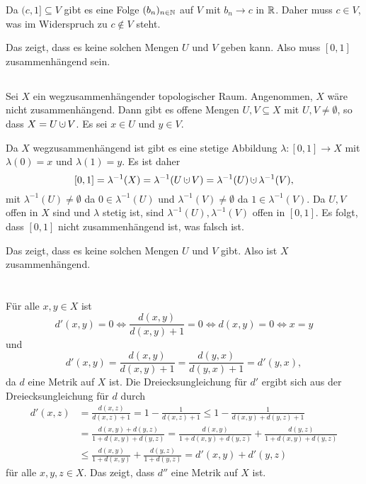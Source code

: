 \documentclass[a4paper,10pt]{article}
\begin{document}
Da $(c,1] \subseteq V$ gibt es eine Folge $(b_n)_{n \in \mathbb{N}}$ auf $V$ mit $b_n \to c$ in $\mathbb{R}$. Daher muss $c \in V$, was im Widerspruch zu $c \not\in V$ steht.

Das zeigt, dass es keine solchen Mengen $U$ und $V$ geben kann. Also muss $[0,1]$ zusammenhängend sein.


\subsection{}
Sei $X$ ein wegzusammenhängender topologischer Raum. Angenommen, $X$ wäre nicht zusammenhängend. Dann gibt es offene Mengen $U, V \subseteq X$ mit $U, V \neq \emptyset$, so dass $X = U \dotcup V$. Es sei $x \in U$ und $y \in V$.

Da $X$ wegzusammenhängend ist gibt es eine stetige Abbildung $\lambda : [0,1] \to X$ mit $\lambda(0) = x$ und $\lambda(1) = y$. Es ist daher
\[
 [0,1] = \lambda^{-1}(X) = \lambda^{-1}(U \dotcup V) = \lambda^{-1}(U) \dotcup \lambda^{-1}(V),
\]
mit $\lambda^{-1}(U) \neq \emptyset$ da $0 \in \lambda^{-1}(U)$ und $\lambda^{-1}(V) \neq \emptyset$ da $1 \in \lambda^{-1}(V)$. Da $U, V$ offen in $X$ sind und $\lambda$ stetig ist, sind $\lambda^{-1}(U), \lambda^{-1}(V)$ offen in $[0,1]$. Es folgt, dass $[0,1]$ nicht zusammenhängend ist, was falsch ist.

Das zeigt, dass es keine solchen Mengen $U$ und $V$ gibt. Also ist $X$ zusammenhängend.





\addtocounter{section}{1}





\section{}


\subsection{}
Für alle $x,y \in X$ ist
\[
 d'(x,y) = 0 \Leftrightarrow \frac{d(x,y)}{d(x,y)+1} = 0 \Leftrightarrow d(x,y) = 0 \Leftrightarrow x=y
\]
und
\[
 d'(x,y) = \frac{d(x,y)}{d(x,y)+1} = \frac{d(y,x)}{d(y,x)+1} = d'(y,x),
\]
da $d$ eine Metrik auf $X$ ist. Die Dreiecksungleichung für $d'$ ergibt sich aus der Dreiecksungleichung für $d$ durch
\begin{align*}
 d'(x,z)
 &= \frac{d(x,z)}{d(x,z)+1}
 = 1 - \frac{1}{d(x,z)+1}
 \leq 1 - \frac{1}{d(x,y)+d(y,z)+1} \\
 &= \frac{d(x,y)+d(y,z)}{1+d(x,y)+d(y,z)}
 = \frac{d(x,y)}{1+d(x,y)+d(y,z)} + \frac{d(y,z)}{1+d(x,y)+d(y,z)}\\
 &\leq \frac{d(x,y)}{1+d(x,y)} + \frac{d(y,z)}{1+d(y,z)}
 = d'(x,y) + d'(y,z)
\end{align*}
für alle $x,y,z \in X$. Das zeigt, dass $d''$ eine Metrik auf $X$ ist.
\end{document}
